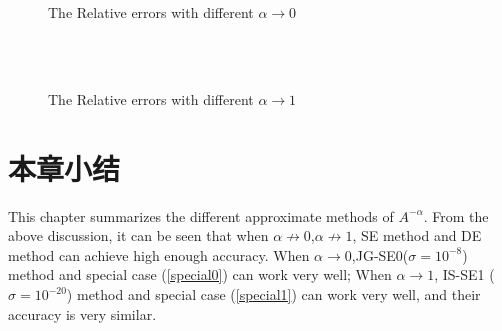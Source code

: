 \begin{figure}[htbp]
\centering
{}
~~
~~
\\
~~
~~
  \caption{The Relative errors with different $\alpha \rightarrow 0$}
  \label{improved_small}
\end{figure}

\begin{figure}[htbp]
\centering
{}
~~
~~
\\
~~
~~
  \caption{The Relative errors with different $\alpha \rightarrow 1$}
  \label{improved}
\end{figure}

\section{本章小结}

This chapter summarizes the different approximate methods of $A^{-\alpha}$. From the above discussion, it can be seen that when $\alpha \not\rightarrow 0 $,$\alpha \not\rightarrow 1$, SE method and DE method can achieve high enough accuracy. When $\alpha \rightarrow 0 $,JG-SE0($\sigma=10^{-8}$) method and special case (\ref{special0}) can work very well; When $\alpha \rightarrow 1$, IS-SE1 ($\sigma=10^{-20}$) method and special case (\ref{special1}) can work very well, and their accuracy is very similar.